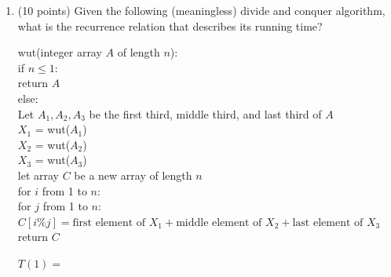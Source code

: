 \documentclass[11pt]{article}
\begin{document}
\begin{enumerate}
    \begin{enumerate}
        \item Describe the class of best-case inputs and give the simplest $f(n)$ so that
        their runtime is $\Theta(f(n))$.
        \item Describe the class of worst-case inputs and give the simplest $f(n)$ so that
        their runtime is $\Theta(f(n))$.
    \end{enumerate}


\newpage

\begin{center}
\LARGE\textbf{Section 3 (Recursion)\\}%
\end{center}

\subsection*{Handwritten}
\item (10 points) Given the following (meaningless) divide and conquer algorithm,
what is the recurrence relation that describes its running time?

    \begin{algo}
    wut(integer array $A$ of length $n$): \+ \\
    if $n \leq 1$:\+\\
        return $A$\-\\
    else:\+\\
    Let $A_1, A_2, A_3$ be the first third, middle third, and last third of $A$\\
    $X_1$ = wut($A_1$)\\
    $X_2$ = wut($A_2$)\\
    $X_3$ = wut($A_3$)\\
    let array $C$ be a new array of length $n$\\
    for $i$ from 1 to $n$:\+\\
        for $j$ from 1 to $n$:\+\\
            $C[i \% j] = \textrm{first element of } X_1 + \textrm{middle element of
            }X_2 +\textrm{last element of } X_3$\-\-\\
    return $C$\-\\
    \end{algo}

$T(1) =$ \underline{\hspace{2cm}}\\


\end{enumerate}
\end{document}
